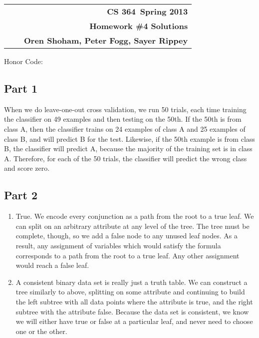 \documentclass[11pt]{article}
\makeatletter
\newcommand{\course}{CS 364}
\newcommand{\semester}{Spring 2013}
\newcommand{\hwk}{Homework \#4 Solutions}
\newcommand{\student}{Oren Shoham, Peter Fogg, Sayer Rippey}
\renewcommand\maketitle{
\begin{center}
\begin{tabular*}{6.44in}{l @{\extracolsep{\fill}}c r}
\bfseries  &  & \bfseries \course ~\semester \\
\bfseries&  & \bfseries  \hwk  \\
\bfseries   &   &  \bfseries \student \\ 
\end{tabular*}
\end{center} }
\makeatother
\begin{document}
\maketitle
\thispagestyle{plain}


\noindent Honor Code: 

\subsection*{Part 1}
When we do leave-one-out cross validation, we run 50 trials, each time training the classifier on 49  examples and then testing on the 50th. If the 50th is from class A, then the classifier trains on 24 examples of class A and 25 examples of class B, and will predict B for the test. Likewise, if the 50th example is from class B, the classifier will predict A, because the majority of the training set is in class A. Therefore, for each of the 50 trials, the classifier will predict the wrong class and score zero.
\subsection*{Part 2}
\begin{enumerate}
\item True. We encode every conjunction as a path from the root to a true leaf. We can split on an arbitrary attribute at any level of the tree. The tree must be complete, though, so we add a false node to any unused leaf nodes. As a result, any assignment of variables which would satisfy the formula corresponds to a path from the root to a true leaf. Any other assignment would reach a false leaf.
\item A consistent binary data set is really just a truth table. We can construct a tree similarly to above, splitting on some attribute and continuing to build the left subtree with all data points where the attribute is true, and the right subtree with the attribute false. Because the data set is consistent, we know we will either have true or false at a particular leaf, and never need to choose one or the other.
\end{enumerate}
\end{document}
